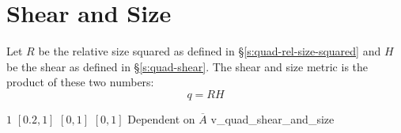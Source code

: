 \section{Shear and Size\label{s:quad-shear-and-size}}

Let $R$ be the relative size squared as defined in \S\ref{s:quad-rel-size-squared}
and $H$ be the shear as defined in \S\ref{s:quad-shear}.
The shear and size metric is the product of these two numbers:
\[
q = RH
\]

%
{$1$}%
{$[0.2,1]$}%
{$[0,1]$}%
{$[0,1]$}%
{Dependent on $\overline{A}$}%
{\cite{knu:03}}%
{v\_quad\_shear\_and\_size}%

